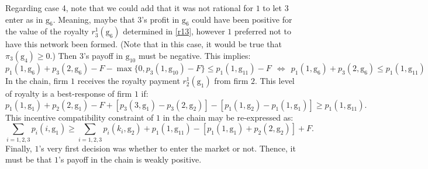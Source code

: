 \documentclass{article}
\begin{document}
Regarding case 4, note that we could add that it was not rational for $1$ to let $3$ enter as in $\text{g}_6$. Meaning, maybe that $3$'s profit in $\text{g}_6$ could have been positive for the value of the royalty $r^1_3(\text{g}_6)$ determined in \eqref{r13}, however $1$ preferred not to have this network been formed. (Note that in this case, it would be true that $\pi_3(\text{g}_4)\geq 0$.) Then $3$'s payoff in $\text{g}_{10}$ must be negative. This implies:
\begin{equation*}
    p_1(1,\text{g}_6)+p_3(2,\text{g}_6)-F - \max\{0, p_3(1,\text{g}_{10})-F\}\leq p_1(1,\text{g}_{11})-F~~\Longleftrightarrow~~p_1(1,\text{g}_6)+p_3(2,\text{g}_6)\leq p_1(1,\text{g}_{11})
\end{equation*}
In the chain, firm $1$ receives the royalty payment $r^1_2(\text{g}_1)$ from firm $2$. This level of royalty is a best-response of firm $1$ if: 
\begin{equation*}
  p_1(1,\text{g}_1)+ p_2(2,\text{g}_1)-F+[ p_3(3,\text{g}_1)-p_3(2,\text{g}_2)]-[p_1(1,\text{g}_2)-p_1(1,\text{g}_1)] \geq p_1(1,\text{g}_{11}).  
\end{equation*}
This incentive compatibility constraint of $1$ in the chain may be re-expressed as: 
\begin{equation}
    \sum_{i=1,2,3} p_i(i,\text{g}_1) \geq \sum_{i=1,2,3}p_i(k_i,\text{g}_2)+p_1(1,\text{g}_{11})-[p_1(1,\text{g}_1)+p_2(2,\text{g}_2)] +F. 
\end{equation}
\indent Finally, $1$'s very first decision was whether to enter the market or not. Thence, it must be that $1$'s payoff in the chain is weakly positive. 
\end{document}

